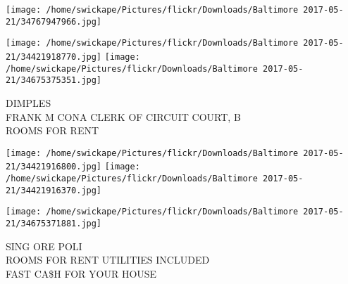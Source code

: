 \documentclass[10pt,letterpaper]{article}
\begin{document}
\texttt{[image: /home/swickape/Pictures/flickr/Downloads/Baltimore 2017-05-21/34767947966.jpg]}

\vspace{0.25in}
\texttt{[image: /home/swickape/Pictures/flickr/Downloads/Baltimore 2017-05-21/34421918770.jpg]}
\texttt{[image: /home/swickape/Pictures/flickr/Downloads/Baltimore 2017-05-21/34675375351.jpg]}

DIMPLES\\
FRANK M CONA CLERK OF CIRCUIT COURT, B\\
ROOMS FOR RENT
\pagebreak

\texttt{[image: /home/swickape/Pictures/flickr/Downloads/Baltimore 2017-05-21/34421916800.jpg]}
\texttt{[image: /home/swickape/Pictures/flickr/Downloads/Baltimore 2017-05-21/34421916370.jpg]}

\texttt{[image: /home/swickape/Pictures/flickr/Downloads/Baltimore 2017-05-21/34675371881.jpg]}

SING ORE POLI\\
ROOMS FOR RENT UTILITIES INCLUDED\\
FAST CA\$H FOR YOUR HOUSE
\pagebreak
\end{document}
